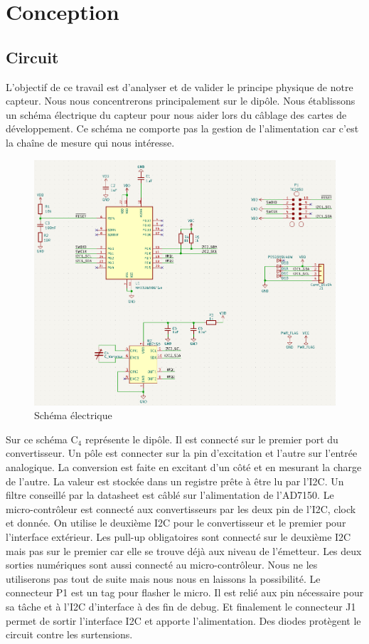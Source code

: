 \graphicspath{ {./figuresConception} }
\section{Conception}

\subsection{Circuit}
L'objectif de ce travail est d'analyser et de valider le principe physique de notre capteur. Nous nous concentrerons principalement sur le dipôle. Nous établissons un schéma électrique du capteur pour nous aider lors du câblage des cartes de développement. Ce schéma ne comporte pas la gestion de l'alimentation car c'est la chaîne de mesure qui nous intéresse.

\begin{figure}[!ht]
 \centering
 \includegraphics[width=14cm]{schemaelec.png}
 \caption{Schéma électrique}
\end{figure}

Sur ce schéma C$_4$ représente le dipôle. Il est connecté sur le premier port du convertisseur. Un pôle est connecter sur la pin d'excitation et l'autre sur l'entrée analogique. La conversion est faite en excitant d'un côté et en mesurant la charge de l'autre. La valeur est stockée dans un registre prête à être lu par l'I2C. Un filtre conseillé par la datasheet est câblé sur l'alimentation de l'AD7150. Le micro-contrôleur est connecté aux convertisseurs par les deux pin de l'I2C, clock et donnée. On utilise le deuxième I2C pour le convertisseur et le premier pour l'interface extérieur. Les pull-up obligatoires sont connecté sur le deuxième I2C mais pas sur le premier car elle se trouve déjà aux niveau de l'émetteur. Les deux sorties numériques sont aussi connecté au micro-contrôleur. Nous ne les utiliserons pas tout de suite mais nous nous en laissons la possibilité. Le connecteur P1 est un tag pour flasher le micro. Il est relié aux pin nécessaire pour sa tâche et à l'I2C d'interface à des fin de debug. Et finalement le connecteur J1 permet de sortir l'interface I2C et apporte l'alimentation. Des diodes protègent le circuit contre les surtensions.  


